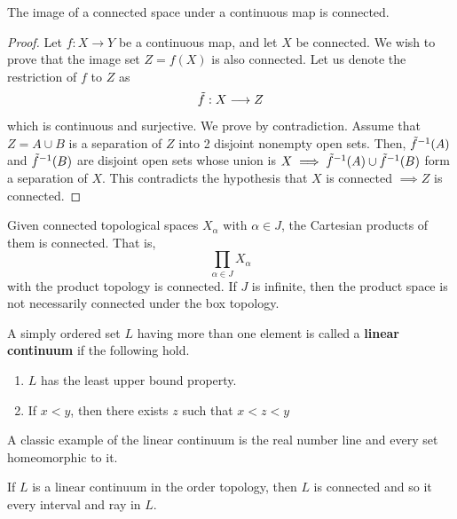     \begin{theorem}
      The image of a connected space under a continuous map is connected. 
    \end{theorem}
    \begin{proof}
      Let $f: X \longrightarrow Y$ be a continuous map, and let $X$ be connected. We wish to prove that the image set $Z = f(X)$ is also connected. Let us denote the restriction of $f$ to $Z$ as
      \begin{equation}
        \Tilde{f}: X \longrightarrow Z
      \end{equation}
      which is continuous and surjective. We prove by contradiction. Assume that $Z = A \cup B$ is a separation of $Z$ into 2 disjoint nonempty open sets. Then, $\Tilde{f}^{-1} (A)$ and $\Tilde{f}^{-1}(B)$ are disjoint open sets whose union is $X \implies \Tilde{f}^{-1} (A) \cup \Tilde{f}^{-1}(B)$ form a separation of $X$. This contradicts the hypothesis that $X$ is connected $\implies Z$ is connected.  
    \end{proof}

    \begin{theorem}
      Given connected topological spaces $X_\alpha$ with $\alpha \in J$, the Cartesian products of them is connected. That is, 
      \begin{equation}
        \prod_{\alpha \in J} X_\alpha
      \end{equation}
      with the product topology is connected. If $J$ is infinite, then the product space is not necessarily connected under the box topology. 
    \end{theorem}

    \begin{definition}
      A simply ordered set $L$ having more than one element is called a \textbf{linear continuum} if the following hold. 
      \begin{enumerate}
        \item $L$ has the least upper bound property. 
        \item If $x <y$, then there exists $z$ such that $x<z<y$
      \end{enumerate}
      A classic example of the linear continuum is the real number line and every set homeomorphic to it. 
    \end{definition}

    \begin{theorem}
      If $L$ is a linear continuum in the order topology, then $L$ is connected and so it every interval and ray in $L$. 
    \end{theorem}

